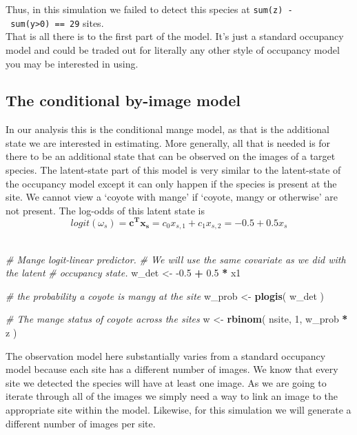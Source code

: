 \documentclass[
]{article}
\newenvironment{Shaded}{\begin{snugshade}}{\end{snugshade}}
\newcommand{\CommentTok}[1]{\textcolor[rgb]{0.56,0.35,0.01}{\textit{#1}}}
\newcommand{\DecValTok}[1]{\textcolor[rgb]{0.00,0.00,0.81}{#1}}
\newcommand{\FloatTok}[1]{\textcolor[rgb]{0.00,0.00,0.81}{#1}}
\newcommand{\KeywordTok}[1]{\textcolor[rgb]{0.13,0.29,0.53}{\textbf{#1}}}
\newcommand{\NormalTok}[1]{#1}
\newcommand{\OperatorTok}[1]{\textcolor[rgb]{0.81,0.36,0.00}{\textbf{#1}}}
\newcommand{\StringTok}[1]{\textcolor[rgb]{0.31,0.60,0.02}{#1}}
\begin{document}
Thus, in this simulation we failed to detect this species at
\texttt{sum(z)\ -\ sum(y\textgreater{}0)\ ==\ 29} sites.\\
That is all there is to the first part of the model. It's just a
standard occupancy model and could be traded out for literally any other
style of occupancy model you may be interested in using.

\hypertarget{the-conditional-by-image-model}{%
\subsection{The conditional by-image
model}\label{the-conditional-by-image-model}}

In our analysis this is the conditional mange model, as that is the
additional state we are interested in estimating. More generally, all
that is needed is for there to be an additional state that can be
observed on the images of a target species. The latent-state part of
this model is very similar to the latent-state of the occupancy model
except it can only happen if the species is present at the site. We
cannot view a `coyote with mange' if `coyote, mangy or otherwise' are
not present. The log-odds of this latent state is\\
\[logit(\omega_s) = \bm{c^T x_s} = c_0 x_{s,1} + c_1 x_{s,2} = -0.5 + 0.5 x_s\]\\

\begin{Shaded}
\begin{Highlighting}[]
\CommentTok{# Mange logit-linear predictor.}
\CommentTok{#  We will use the same covariate as we did with the latent}
\CommentTok{#  occupancy state.}
\NormalTok{w_det <-}\StringTok{ }\FloatTok{-0.5} \OperatorTok{+}\StringTok{ }\FloatTok{0.5} \OperatorTok{*}\StringTok{ }\NormalTok{x1 }

\CommentTok{# the probability a coyote is mangy at the site}
\NormalTok{w_prob <-}\StringTok{ }\KeywordTok{plogis}\NormalTok{(}
\NormalTok{  w_det}
\NormalTok{) }

\CommentTok{# The mange status of coyote across the sites}
\NormalTok{w <-}\StringTok{ }\KeywordTok{rbinom}\NormalTok{(}
\NormalTok{  nsite,}
  \DecValTok{1}\NormalTok{,}
\NormalTok{  w_prob }\OperatorTok{*}\StringTok{ }\NormalTok{z}
\NormalTok{)}
\end{Highlighting}
\end{Shaded}

The observation model here substantially varies from a standard
occupancy model because each site has a different number of images. We
know that every site we detected the species will have at least one
image. As we are going to iterate through all of the images we simply
need a way to link an image to the appropriate site within the model.
Likewise, for this simulation we will generate a different number of
images per site.\\
\end{document}
